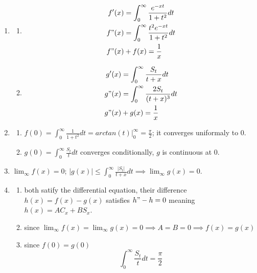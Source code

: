 \begin{solution}
\begin{enumerate}
  \item 
    \begin{enumerate}
      \item $$\begin{align}
          f'(x) & = \int_0^{\infty} \frac{e^{-xt}}{1+t^2}dt \\
          f"(x) & = \int_0^{\infty} \frac{t^2 e^{-xt}}{1+t^2}dt \\
          f"(x) & + f(x) = \frac{1}{x}
      \end{align}$$ 
      
    \item $$\begin{align}
        g'(x) & = \int_0^{\infty} \frac{S_t}{t+x} dt \\
        g"(x) & = \int_0^{\infty} \frac{2S_t}{(t+x)^3}dt \\
        g"(x) & + g(x) = \frac{1}{x}
    \end{align}$$ 
    \end{enumerate}
  
  \item \begin{enumerate}
      \item $f(0) = \int_0^{\infty} \frac{1}{1+t^2} dt = arctan(t)|_0^{\infty} = \frac{\pi}{2}$; it converges uniformaly to $0$. 
      
      \item $g(0) = \int_0^{\infty} \frac{S_t}{t}dt$ converges conditionally, $g$ is continuous at $0$.
  \end{enumerate} 
  
\item $\lim_{\infty} f(x) = 0$; $|g(x)| \le \int_0^{\infty} \frac{|S_t|}{t+x}dt \implies \lim_{\infty} g(x) = 0$. 
  
\item 
  \begin{enumerate}
    \item both satify the differential equation, their difference $h(x) = f(x) - g(x)$ satisfies $h" - h = 0$ meaning $h(x) = AC_x + BS_x$.

    \item since $\lim_{\infty} f(x) = \lim_{\infty} g(x) = 0 \implies A = B = 0 \implies f(x) = g(x)$
   
    \item since $f(0) = g(0)$ $$\int_0^{\infty} \frac{S_t}{t} dt = \frac{\pi}{2}$$ 
  \end{enumerate}
\end{enumerate}
\end{solution}

